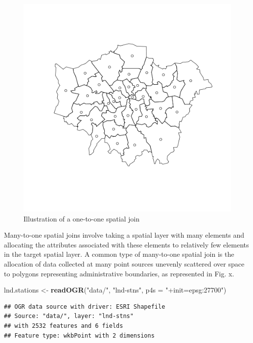 \documentclass[]{article}
\makeatletter
\newenvironment{Shaded}{}{}
\newcommand{\KeywordTok}[1]{\textcolor[rgb]{0.00,0.44,0.13}{\textbf{{#1}}}}
\newcommand{\DataTypeTok}[1]{\textcolor[rgb]{0.56,0.13,0.00}{{#1}}}
\newcommand{\StringTok}[1]{\textcolor[rgb]{0.25,0.44,0.63}{{#1}}}
\newcommand{\NormalTok}[1]{{#1}}
\def\maxwidth{\ifdim\Gin@nat@width>\linewidth\linewidth
\else\Gin@nat@width\fi}
\let\Oldincludegraphics\includegraphics
\renewcommand{\includegraphics}[1]{\Oldincludegraphics[width=\maxwidth]{#1}}
\makeatother
\begin{document}
\begin{figure}[htbp]
\centering
\includegraphics{figure/Illustration_of_a_one-to-one_spatial_join_.png}
\caption{Illustration of a one-to-one spatial join}
\end{figure}

Many-to-one spatial joins involve taking a spatial layer with many
elements and allocating the attributes associated with these elements to
relatively few elements in the target spatial layer. A common type of
many-to-one spatial join is the allocation of data collected at many
point sources unevenly scattered over space to polygons representing
administrative boundaries, as represented in Fig. x.

\begin{Shaded}
\begin{Highlighting}[]
\NormalTok{lnd.stations <-}\StringTok{ }\KeywordTok{readOGR}\NormalTok{(}\StringTok{"data/"}\NormalTok{, }\StringTok{"lnd-stns"}\NormalTok{, }\DataTypeTok{p4s =} \StringTok{"+init=epsg:27700"}\NormalTok{)}
\end{Highlighting}
\end{Shaded}

\begin{verbatim}
## OGR data source with driver: ESRI Shapefile 
## Source: "data/", layer: "lnd-stns"
## with 2532 features and 6 fields
## Feature type: wkbPoint with 2 dimensions
\end{verbatim}
\end{document}
